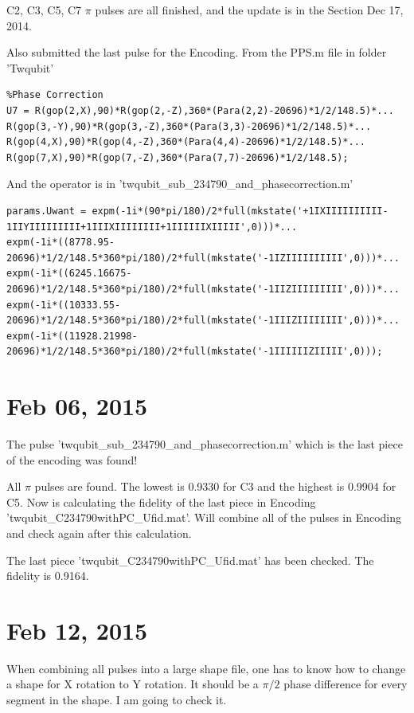 \documentclass[prl,onecolumn]{revtex4-1}
\begin{document}
C2, C3, C5, C7 $\pi$ pulses are all finished, and the update is in the Section Dec 17, 2014.

Also submitted the last pulse for the Encoding. From the PPS.m file in folder 'Twqubit'
\begin{lstlisting}
%Phase Correction
U7 = R(gop(2,X),90)*R(gop(2,-Z),360*(Para(2,2)-20696)*1/2/148.5)*...
R(gop(3,-Y),90)*R(gop(3,-Z),360*(Para(3,3)-20696)*1/2/148.5)*...
R(gop(4,X),90)*R(gop(4,-Z),360*(Para(4,4)-20696)*1/2/148.5)*...
R(gop(7,X),90)*R(gop(7,-Z),360*(Para(7,7)-20696)*1/2/148.5);
\end{lstlisting}

And the operator is in 'twqubit\_sub\_234790\_and\_phasecorrection.m'
\begin{lstlisting}
params.Uwant = expm(-1i*(90*pi/180)/2*full(mkstate('+1IXIIIIIIIIII-1IIYIIIIIIIII+1IIIXIIIIIIII+1IIIIIIXIIIII',0)))*...
expm(-1i*((8778.95-20696)*1/2/148.5*360*pi/180)/2*full(mkstate('-1IZIIIIIIIIII',0)))*...
expm(-1i*((6245.16675-20696)*1/2/148.5*360*pi/180)/2*full(mkstate('-1IIZIIIIIIIII',0)))*...
expm(-1i*((10333.55-20696)*1/2/148.5*360*pi/180)/2*full(mkstate('-1IIIZIIIIIIII',0)))*...
expm(-1i*((11928.21998-20696)*1/2/148.5*360*pi/180)/2*full(mkstate('-1IIIIIIZIIIII',0)));
\end{lstlisting}

\newpage
\section{Feb 06, 2015}

The pulse 'twqubit\_sub\_234790\_and\_phasecorrection.m' which is the last piece of the encoding was found!

All $\pi$ pulses are found. The lowest is 0.9330 for C3 and the highest is 0.9904 for C5. Now is calculating the fidelity of the last piece in Encoding
'twqubit\_C234790withPC\_Ufid.mat'. Will combine all of the pulses in Encoding and check again after this calculation.

The last piece 'twqubit\_C234790withPC\_Ufid.mat' has been checked. The fidelity is 0.9164.

\newpage
\section{Feb 12, 2015}

When combining all pulses into a large shape file, one has to know how to change a shape for X rotation to Y rotation. It should be a $\pi/2$ phase difference for every segment in the shape. I am going to check it.
\end{document}
